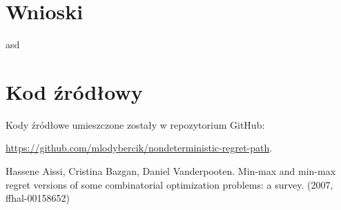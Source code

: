 \documentclass[10pt]{article}
\begin{document}
\section{Wnioski}
asd

\newpage
\appendix

\section{Kod źródłowy}
Kody źródłowe umieszczone zostały w repozytorium GitHub:

\noindent \url{https://github.com/mlodybercik/nondeterministic-regret-path}.

\begin{thebibliography}{9}
    Hassene Aissi, Cristina Bazgan, Daniel Vanderpooten.
    Min-max and min-max regret versions of some combinatorial optimization problems: a survey. (2007, ffhal-00158652)

\end{thebibliography}
\end{document}
